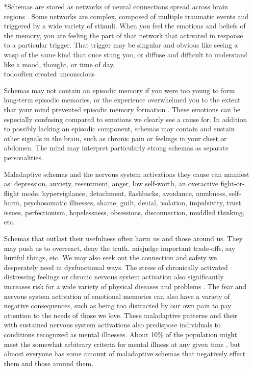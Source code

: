 \documentclass[12pt,letterpaper]{article}
\begin{document}
*Schemas are stored as networks of neural connections spread across brain regions \cite{eckerUnlocking}. Some networks are complex, composed of multiple traumatic events and triggered by a wide variety of stimuli. When you feel the emotions and beliefs of the memory, you are feeling the part of that network that activated in response to a particular trigger. That trigger may be singular and obvious like seeing a wasp of the same kind that once stung you, or diffuse and difficult to understand like a mood, thought, or time of day. \\todo{often created unconscious}

Schemas may not contain an episodic memory if you were too young to form long-term episodic memories, or the experience overwhelmed you to the extent that your mind prevented episodic memory formation \cite{vanderKolkBody,brownAttachmentDisturbances}. These emotions can be especially confusing compared to emotions we clearly see a cause for. In addition to possibly lacking an episodic component, schemas may contain and sustain other signals in the brain, such as chronic pain or feelings in your chest or abdomen. The mind may interpret particularly strong schemas as separate personalities.

Maladaptive schemas and the nervous system activations they cause can manifest as: depression, anxiety, resentment, anger, low self-worth, an overactive fight-or-flight mode, hypervigilance, detachment, flashbacks, avoidance, numbness, self-harm, psychosomatic illnesses, shame, guilt, denial, isolation, impulsivity, trust issues, perfectionism, hopelessness, obsessions, disconnection, muddled thinking, etc. 

Schemas that outlast their usefulness often harm us and those around us. They may push us to overreact, deny the truth, misjudge important trade-offs, say hurtful things, etc. We may also seek out the connection and safety we desperately need in dysfunctional ways. The stress of chronically activated distressing feelings or chronic nervous system activation also significantly increases risk for a wide variety of physical diseases and problems \cite{felittiACE}.  The fear and nervous system activation of emotional memories can also have a variety of negative consequences, such as being too distracted by our own pain to pay attention to the needs of those we love. These maladaptive patterns and their with sustained nervous system activations also predispose individuals to conditions recognized as mental illnesses. About 10\% of the population might meet the somewhat arbitrary criteria for mental illness at any given time \cite{whoMentalHealth}, but almost everyone has some amount of maladaptive schemas that negatively effect them and those around them.
\end{document}
